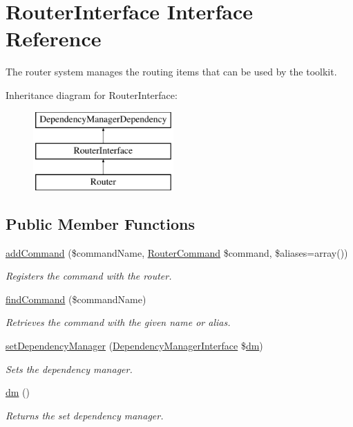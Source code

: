 \hypertarget{interfaceRouterInterface}{\section{Router\-Interface Interface Reference}
\label{interfaceRouterInterface}
}


The router system manages the routing items that can be used by the toolkit.  


Inheritance diagram for Router\-Interface\-:\begin{figure}[H]
\begin{center}
\leavevmode
\includegraphics[height=3.000000cm]{interfaceRouterInterface}
\end{center}
\end{figure}
\subsection*{Public Member Functions}
\begin{DoxyCompactItemize}
\item 
\hyperlink{interfaceRouterInterface_a15c6b0e9c47bce74f071526aedd05c01}{add\-Command} (\$command\-Name, \hyperlink{interfaceRouterCommand}{Router\-Command} \$command, \$aliases=array())
\begin{DoxyCompactList}\small\item\em Registers the command with the router. \end{DoxyCompactList}\item 
\hyperlink{interfaceRouterInterface_a3207428a5b9cd1f54ba0e141aba4873c}{find\-Command} (\$command\-Name)
\begin{DoxyCompactList}\small\item\em Retrieves the command with the given name or alias. \end{DoxyCompactList}\item 
\hyperlink{interfaceDependencyManagerDependency_a9ff6287d65d2a7337595cd66c839e33f}{set\-Dependency\-Manager} (\hyperlink{interfaceDependencyManagerInterface}{Dependency\-Manager\-Interface} \$\hyperlink{interfaceDependencyManagerDependency_aefcac5c2e195eaab895ce6378fc5aa31}{dm})
\begin{DoxyCompactList}\small\item\em Sets the dependency manager. \end{DoxyCompactList}\item 
\hyperlink{interfaceDependencyManagerDependency_aefcac5c2e195eaab895ce6378fc5aa31}{dm} ()
\begin{DoxyCompactList}\small\item\em Returns the set dependency manager. \end{DoxyCompactList}\end{DoxyCompactItemize}


